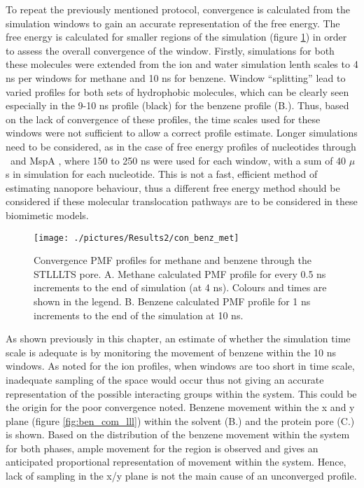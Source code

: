 To repeat the previously mentioned protocol, convergence is calculated from the simulation windows to gain an accurate representation of the free energy. The free energy is calculated for smaller regions of the simulation (figure \ref{fig:con_benz_met}) in order to assess the overall convergence of the window. Firstly, simulations for both these molecules were extended from the ion and water simulation lenth scales to 4 ns per windows for methane and 10 ns for benzene. Window ``splitting'' lead to varied profiles for both sets of hydrophobic molecules, which can be clearly seen especially in the 9-10 ns profile (black) for the benzene profile (B.). Thus, based on the lack of convergence of these profiles, the time scales used for these windows were not sufficient to allow a correct profile estimate. Longer simulations need to be considered, as in the case of free energy profiles of nucleotides through \ahl\ and MspA \cite{Manara2015c,Manara2015d}, where 150 to 250 ns were used for each window, with a sum of 40 $\mu$s in simulation for each nucleotide. This is not a fast, efficient method of estimating nanopore behaviour, thus a different free energy method should be considered if these molecular translocation pathways are to be considered in these biomimetic models. 


\begin{figure}[H]
\begin{center}
\texttt{[image: ./pictures/Results2/con\_benz\_met]}
\caption[Convergence PMF profiles for methane and benzene through the STLLLTS pore.] {Convergence PMF profiles for methane and benzene through the STLLLTS pore. A. Methane calculated PMF profile for every 0.5 ns increments to the end of simulation (at 4 ns). Colours and times are shown in the legend. B. Benzene calculated PMF profile for 1 ns increments to the end of the simulation at 10 ns.}  
\label{fig:con_benz_met}
\end{center}
\end{figure}

As shown previously in this chapter, an estimate of whether the simulation time scale is adequate is by monitoring the movement of benzene within the 10 ns windows. As noted for the ion profiles, when windows are too short in time scale, inadequate sampling of the space would occur thus not giving an accurate representation of the possible interacting groups within the system. This could be the origin for the poor convergence noted.  Benzene movement within the x and y plane (figure \ref{fig:ben_com_lll}) within the solvent (B.) and the protein pore (C.) is shown. Based on the distribution of the benzene movement within the system for both phases, ample movement for the region is observed and gives an anticipated proportional representation of movement within the system. Hence, lack of sampling in the x/y plane is not the main cause of an unconverged profile.


